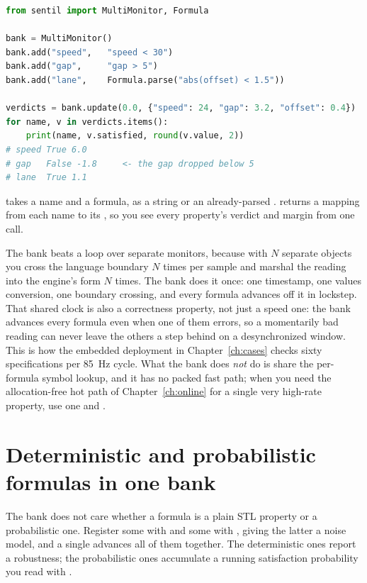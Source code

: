 \begin{lstlisting}[language=Python]
from sentil import MultiMonitor, Formula

bank = MultiMonitor()
bank.add("speed",   "speed < 30")
bank.add("gap",     "gap > 5")
bank.add("lane",    Formula.parse("abs(offset) < 1.5"))

verdicts = bank.update(0.0, {"speed": 24, "gap": 3.2, "offset": 0.4})
for name, v in verdicts.items():
    print(name, v.satisfied, round(v.value, 2))
# speed True 6.0
# gap   False -1.8     <- the gap dropped below 5
# lane  True 1.1
\end{lstlisting}

 takes a name and a formula, as a string or an already-parsed .  returns a mapping from each name to its , so you see every property's verdict and margin from one call.

The bank beats a loop over separate monitors, because with $N$ separate  objects you cross the language boundary $N$ times per sample and marshal the reading into the engine's form $N$ times. The bank does it once: one timestamp, one values conversion, one boundary crossing, and every formula advances off it in lockstep. That shared clock is also a correctness property, not just a speed one: the bank advances every formula even when one of them errors, so a momentarily bad reading can never leave the others a step behind on a desynchronized window. This is how the embedded deployment in Chapter~\ref{ch:cases} checks sixty specifications per 85~Hz cycle. What the bank does \emph{not} do is share the per-formula symbol lookup, and it has no packed fast path; when you need the allocation-free hot path of Chapter~\ref{ch:online} for a single very high-rate property, use one  and .

\section{Deterministic and probabilistic formulas in one bank}

The bank does not care whether a formula is a plain STL property or a probabilistic one. Register some with  and some with , giving the latter a noise model, and a single  advances all of them together. The deterministic ones report a robustness; the probabilistic ones accumulate a running satisfaction probability you read with .

